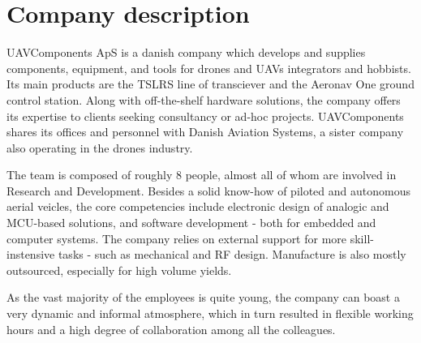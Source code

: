 \section{Company description}
UAVComponents ApS is a danish company which develops and supplies components, equipment, and tools for drones and UAVs integrators and hobbists.
Its main products are the TSLRS line of transciever and the Aeronav One ground control station.
Along with off-the-shelf hardware solutions, the company offers its expertise to clients seeking consultancy or ad-hoc projects.
UAVComponents shares its offices and personnel with Danish Aviation Systems, a sister company also operating in the drones industry. 

The team is composed of roughly 8 people, almost all of whom are involved in Research and Development. 
Besides a solid know-how of piloted and autonomous aerial veicles, the core competencies include electronic design of analogic and MCU-based solutions, and software development - both for embedded and computer systems. 
The company relies on external support for more skill-instensive tasks - such as mechanical and RF design. 
Manufacture is also mostly outsourced, especially for high volume yields.

As the vast majority of the employees is quite young, the company can boast a very dynamic and informal atmosphere, which in turn resulted in flexible working hours and a high degree of collaboration among all the colleagues.

